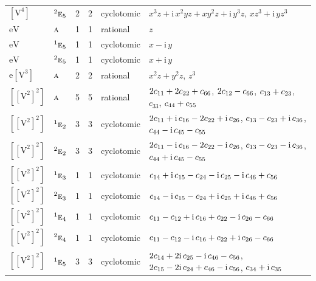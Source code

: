\documentclass[10pt,a4paper]{article}
\numberwithin{equation}{section}
\newcommand{\irr}[1]{\text{\normalfont\scshape #1}}
\newcommand{\conjpair}[1]{{}^{#1}}
\newcommand{\iunit}{\mathrm{i}}
\newcommand{\jahn}[1]{\mathrm{#1}}
\newlength{\fillwidth}\newlength{\cellwidth}\newlength{\colwidth}
\newcommand{\signbreak}{\penalty100\relax}
\begin{document}
{\begin{longtable}{@{}llrrl>{\RaggedRight\arraybackslash}p{\fillwidth}@{}}
$\jahn{[V^{4}]}$ & $\conjpair{2}\irr{e}_{5}$ & 2 & 2 & cyclotomic & $x^{3}z + \iunit{}\,x^{2}yz + xy^{2}z + \iunit{}\,y^{3}z$, $xz^{3} + \iunit{}\,yz^{3}$\\
$\jahn{eV}$ & $\irr{a}$ & 1 & 1 & rational & $z$\\
$\jahn{eV}$ & $\conjpair{1}\irr{e}_{5}$ & 1 & 1 & cyclotomic & $x - \iunit{}\,y$\\
$\jahn{eV}$ & $\conjpair{2}\irr{e}_{5}$ & 1 & 1 & cyclotomic & $x + \iunit{}\,y$\\
$\jahn{e[V^{3}]}$ & $\irr{a}$ & 2 & 2 & rational & $x^{2}z + y^{2}z$, $z^{3}$\\
$\jahn{[[V^{2}]^{2}]}$ & $\irr{a}$ & 5 & 5 & rational & $2c_{11} +\signbreak 2c_{22} +\signbreak c_{66}$, $2c_{12} -\signbreak c_{66}$, $c_{13} +\signbreak c_{23}$, $c_{33}$, $c_{44} +\signbreak c_{55}$\\
$\jahn{[[V^{2}]^{2}]}$ & $\conjpair{1}\irr{e}_{2}$ & 3 & 3 & cyclotomic & $2c_{11} +\signbreak \iunit{}\,c_{16} -\signbreak 2c_{22} +\signbreak \iunit{}\,c_{26}$, $c_{13} -\signbreak c_{23} +\signbreak \iunit{}\,c_{36}$, $c_{44} -\signbreak \iunit{}\,c_{45} -\signbreak c_{55}$\\
$\jahn{[[V^{2}]^{2}]}$ & $\conjpair{2}\irr{e}_{2}$ & 3 & 3 & cyclotomic & $2c_{11} -\signbreak \iunit{}\,c_{16} -\signbreak 2c_{22} -\signbreak \iunit{}\,c_{26}$, $c_{13} -\signbreak c_{23} -\signbreak \iunit{}\,c_{36}$, $c_{44} +\signbreak \iunit{}\,c_{45} -\signbreak c_{55}$\\
$\jahn{[[V^{2}]^{2}]}$ & $\conjpair{1}\irr{e}_{3}$ & 1 & 1 & cyclotomic & $c_{14} +\signbreak \iunit{}\,c_{15} -\signbreak c_{24} -\signbreak \iunit{}\,c_{25} -\signbreak \iunit{}\,c_{46} +\signbreak c_{56}$\\
$\jahn{[[V^{2}]^{2}]}$ & $\conjpair{2}\irr{e}_{3}$ & 1 & 1 & cyclotomic & $c_{14} -\signbreak \iunit{}\,c_{15} -\signbreak c_{24} +\signbreak \iunit{}\,c_{25} +\signbreak \iunit{}\,c_{46} +\signbreak c_{56}$\\
$\jahn{[[V^{2}]^{2}]}$ & $\conjpair{1}\irr{e}_{4}$ & 1 & 1 & cyclotomic & $c_{11} -\signbreak c_{12} +\signbreak \iunit{}\,c_{16} +\signbreak c_{22} -\signbreak \iunit{}\,c_{26} -\signbreak c_{66}$\\
$\jahn{[[V^{2}]^{2}]}$ & $\conjpair{2}\irr{e}_{4}$ & 1 & 1 & cyclotomic & $c_{11} -\signbreak c_{12} -\signbreak \iunit{}\,c_{16} +\signbreak c_{22} +\signbreak \iunit{}\,c_{26} -\signbreak c_{66}$\\
$\jahn{[[V^{2}]^{2}]}$ & $\conjpair{1}\irr{e}_{5}$ & 3 & 3 & cyclotomic & $2c_{14} +\signbreak 2\iunit{}\,c_{25} -\signbreak \iunit{}\,c_{46} -\signbreak c_{56}$, $2c_{15} -\signbreak 2\iunit{}\,c_{24} +\signbreak c_{46} -\signbreak \iunit{}\,c_{56}$, $c_{34} +\signbreak \iunit{}\,c_{35}$\\

\end{longtable}}
\end{document}

